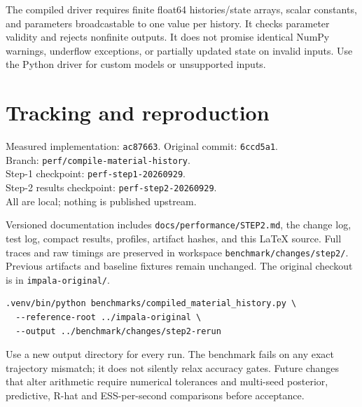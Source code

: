 \documentclass[11pt]{article}
\begin{document}
The compiled driver requires finite float64 histories/state arrays, scalar
constants, and parameters broadcastable to one value per history. It checks
parameter validity and rejects nonfinite outputs. It does not promise identical
NumPy warnings, underflow exceptions, or partially updated state on invalid
inputs. Use the Python driver for custom models or unsupported inputs.
\section*{Tracking and reproduction}
Measured implementation: \texttt{ac87663}. Original commit: \texttt{6ccd5a1}.\\
Branch: \texttt{perf/compile-material-history}.\\
Step-1 checkpoint: \texttt{perf-step1-20260929}.\\
Step-2 results checkpoint: \texttt{perf-step2-20260929}.\\
All are local; nothing is published upstream.

Versioned documentation includes \texttt{docs/performance/STEP2.md}, the change
log, test log, compact results, profiles, artifact hashes, and this LaTeX source.
Full traces and raw timings are preserved in workspace
\texttt{benchmark/changes/step2/}. Previous artifacts and baseline fixtures
remain unchanged. The original checkout is in \texttt{impala-original/}.
\begin{verbatim}
.venv/bin/python benchmarks/compiled_material_history.py \
  --reference-root ../impala-original \
  --output ../benchmark/changes/step2-rerun
\end{verbatim}
Use a new output directory for every run. The benchmark fails on any exact
trajectory mismatch; it does not silently relax accuracy gates. Future changes
that alter arithmetic require numerical tolerances and multi-seed posterior,
predictive, R-hat and ESS-per-second comparisons before acceptance.
\end{document}
